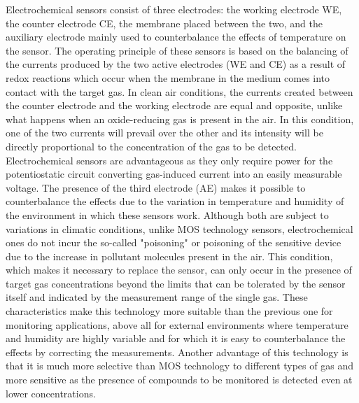 \documentclass[10pt]{../style_src/imeko_acta}
\begin{document}
Electrochemical sensors consist of three electrodes: the working electrode WE, the counter electrode CE, the membrane placed between the two, and the auxiliary electrode mainly used to counterbalance the effects of temperature on the sensor. The operating principle of these sensors is based on the balancing of the currents produced by the two active electrodes (WE and CE) as a result of redox reactions which occur when the membrane in the medium comes into contact with the target gas. In clean air conditions, the currents created between the counter electrode and the working electrode are equal and opposite, unlike what happens when an oxide-reducing gas is present in the air. In this condition, one of the two currents will prevail over the other and its intensity will be directly proportional to the concentration of the gas to be detected. Electrochemical sensors are advantageous as they only require power for the potentiostatic circuit converting gas-induced current into an easily measurable voltage. The presence of the third electrode (AE) makes it possible to counterbalance the effects due to the variation in temperature and humidity of the environment in which these sensors work. Although both are subject to variations in climatic conditions, unlike MOS technology sensors, electrochemical ones do not incur the so-called "poisoning" or poisoning of the sensitive device due to the increase in pollutant molecules present in the air. This condition, which makes it necessary to replace the sensor, can only occur in the presence of target gas concentrations beyond the limits that can be tolerated by the sensor itself and indicated by the measurement range of the single gas. These characteristics make this technology more suitable than the previous one for monitoring applications, above all for external environments where temperature and humidity are highly variable and for which it is easy to counterbalance the effects by correcting the measurements. Another advantage of this technology is that it is much more selective than MOS technology to different types of gas and more sensitive as the presence of compounds to be monitored is detected even at lower concentrations.
\end{document}
